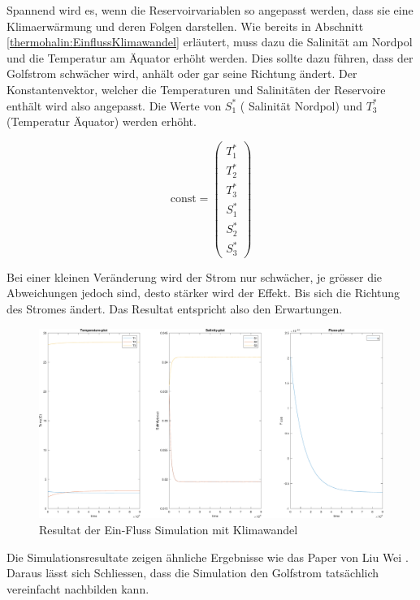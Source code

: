 Spannend wird es, wenn die Reservoirvariablen so angepasst werden, dass sie eine Klimaerwärmung und deren Folgen darstellen. Wie bereits in Abschnitt \ref{thermohalin:EinflussKlimawandel} erläutert, muss dazu die Salinität am Nordpol und die Temperatur am Äquator erhöht werden. Dies sollte dazu führen, dass der Golfstrom schwächer wird, anhält oder gar seine Richtung ändert. 
Der Konstantenvektor, welcher die Temperaturen und Salinitäten der Reservoire enthält wird also angepasst.
Die Werte von $S_1^*$ ( Salinität Nordpol) und $T_3^*$ (Temperatur Äquator) werden erhöht.

\begin{equation*}
\text{const} = \begin{pmatrix}T_{1}^{*} \\ T_{2}^{*} \\ T_{3}^{*} \\ S_{1}^{*} \\ S_{2}^{*} \\ S_{3}^{*}\end{pmatrix}
\end{equation*}



Bei einer kleinen Veränderung wird der Strom nur schwächer, je grösser die Abweichungen jedoch sind, desto stärker wird der Effekt.
Bis sich die Richtung des Stromes ändert.
Das Resultat entspricht also den Erwartungen. 

\begin{figure}
	\centering
	\includegraphics[width=14cm]{thermohalin/Code/graphs/3b1f-skript-klimawandel.pdf}
	\caption{Resultat der Ein-Fluss Simulation mit Klimawandel}
	\label{thermohalin:3b1f-skript-klimawandel}
\end{figure}
Die Simulationsresultate zeigen ähnliche Ergebnisse wie das Paper von Liu Wei \cite{thermohalin:liuwei}. Daraus lässt sich Schliessen, dass die Simulation den Golfstrom tatsächlich vereinfacht nachbilden kann.


